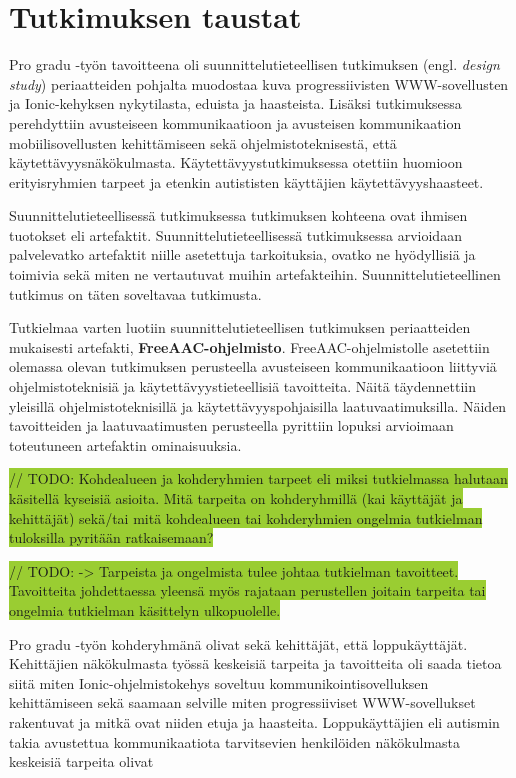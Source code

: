 \documentclass[utf8]{gradu3}
\begin{document}
\chapter{Tutkimuksen taustat}

Pro gradu -työn tavoitteena oli suunnittelutieteellisen tutkimuksen (engl. \textit{design study}) periaatteiden pohjalta muodostaa kuva progressiivisten WWW-sovellusten ja Ionic-kehyksen nykytilasta, eduista ja haasteista. Lisäksi tutkimuksessa perehdyttiin avusteiseen kommunikaatioon ja avusteisen kommunikaation mobiilisovellusten kehittämiseen sekä ohjelmistoteknisestä, että käytettävyysnäkökulmasta. Käytettävyystutkimuksessa otettiin huomioon erityisryhmien tarpeet ja etenkin autististen käyttäjien käytettävyyshaasteet.

Suunnittelutieteellisessä tutkimuksessa tutkimuksen kohteena ovat ihmisen tuotokset eli artefaktit. Suunnittelutieteellisessä tutkimuksessa arvioidaan palvelevatko artefaktit niille asetettuja tarkoituksia, ovatko ne hyödyllisiä ja toimivia sekä miten ne vertautuvat muihin artefakteihin. Suunnittelutieteellinen tutkimus on täten soveltavaa tutkimusta.

Tutkielmaa varten luotiin suunnittelutieteellisen tutkimuksen periaatteiden mukaisesti artefakti, \textbf{FreeAAC-ohjelmisto}. FreeAAC-ohjelmistolle asetettiin olemassa olevan tutkimuksen perusteella avusteiseen kommunikaatioon liittyviä ohjelmistoteknisiä ja käytettävyystieteellisiä tavoitteita. Näitä täydennettiin yleisillä ohjelmistoteknisillä ja käytettävyyspohjaisilla laatuvaatimuksilla. Näiden tavoitteiden ja laatuvaatimusten perusteella pyrittiin lopuksi arvioimaan toteutuneen artefaktin ominaisuuksia.

\colorbox{YellowGreen}{// TODO: Kohdealueen ja kohderyhmien tarpeet eli miksi tutkielmassa halutaan käsitellä kyseisiä asioita. Mitä tarpeita on kohderyhmillä (kai käyttäjät ja kehittäjät) sekä/tai mitä kohdealueen tai kohderyhmien ongelmia tutkielman tuloksilla pyritään ratkaisemaan?}

\colorbox{YellowGreen}{// TODO: -> Tarpeista ja ongelmista tulee johtaa tutkielman tavoitteet. Tavoitteita johdettaessa yleensä myös rajataan perustellen joitain tarpeita tai ongelmia tutkielman käsittelyn ulkopuolelle.}

Pro gradu -työn kohderyhmänä olivat sekä kehittäjät, että loppukäyttäjät. Kehittäjien näkökulmasta työssä keskeisiä tarpeita ja tavoitteita oli saada tietoa siitä miten Ionic-ohjelmistokehys soveltuu kommunikointisovelluksen kehittämiseen sekä saamaan selville miten progressiiviset WWW-sovellukset rakentuvat ja mitkä ovat niiden etuja ja haasteita. Loppukäyttäjien eli autismin takia avustettua kommunikaatiota tarvitsevien henkilöiden näkökulmasta keskeisiä tarpeita olivat 
\end{document}
